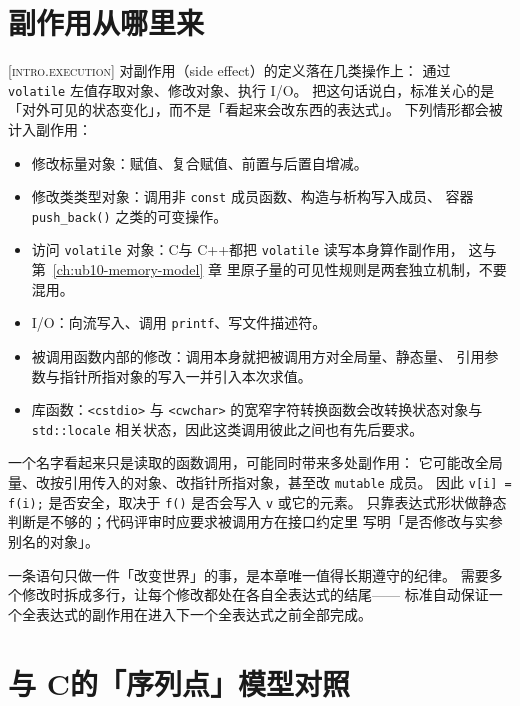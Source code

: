 \documentclass[12pt,a4paper,fontset=fandol]{ctexbook}
\newcommand{\Fn}[1]{\texttt{#1()}}
\newcommand{\Tp}[1]{\texttt{#1}}
\newcommand{\Lang}[1]{\textsf{#1}}
\newcommand{\CL}{\Lang{C}}
\newcommand{\CPP}{\Lang{C++}}
\newcommand{\Std}[1]{\textsc{[#1]}}
\newcommand{\Hdr}[1]{\texttt{<#1>}}
\begin{document}
\section{副作用从哪里来}\label{sec:ub08-sideeffects}

\Std{intro.execution} 对副作用（side effect）的定义落在几类操作上：
通过 \Tp{volatile} 左值存取对象、修改对象、执行 I/O。
把这句话说白，标准关心的是「对外可见的状态变化」，而不是「看起来会改东西的表达式」。
下列情形都会被计入副作用：

\begin{itemize}
\item 修改标量对象：赋值、复合赋值、前置与后置自增减。
\item 修改类类型对象：调用非 \Tp{const} 成员函数、构造与析构写入成员、
      容器 \Fn{push\_back} 之类的可变操作。
\item 访问 \Tp{volatile} 对象：\CL 与 \CPP 都把 \Tp{volatile} 读写本身算作副作用，
      这与 第~\ref{ch:ub10-memory-model} 章 里原子量的可见性规则是两套独立机制，不要混用。
\item I/O：向流写入、调用 \Tp{printf}、写文件描述符。
\item 被调用函数内部的修改：调用本身就把被调用方对全局量、静态量、
      引用参数与指针所指对象的写入一并引入本次求值。
\item 库函数：\Hdr{cstdio} 与 \Hdr{cwchar} 的宽窄字符转换函数会改转换状态对象与
      \Tp{std::locale} 相关状态，因此这类调用彼此之间也有先后要求。
\end{itemize}

\begin{warning}[title={「看不见的写入」同样参与判定}]
一个名字看起来只是读取的函数调用，可能同时带来多处副作用：
它可能改全局量、改按引用传入的对象、改指针所指对象，甚至改 \Tp{mutable} 成员。
因此 \Tp{v[i] = f(i);} 是否安全，取决于 \Fn{f} 是否会写入 \Tp{v} 或它的元素。
只靠表达式形状做静态判断是不够的；代码评审时应要求被调用方在接口约定里
写明「是否修改与实参别名的对象」。
\end{warning}

\begin{guideline}[title={把副作用隔离到独立全表达式}]
一条语句只做一件「改变世界」的事，是本章唯一值得长期遵守的纪律。
需要多个修改时拆成多行，让每个修改都处在各自全表达式的结尾——
标准自动保证一个全表达式的副作用在进入下一个全表达式之前全部完成。
\end{guideline}

\section{与 \CL 的「序列点」模型对照}\label{sec:ub08-vs-c}
\end{document}
